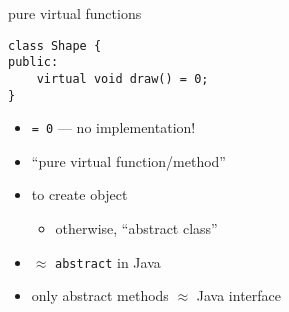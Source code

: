 \begin{frame}{pure virtual functions}
\lstset{language=C++,style=small}
\begin{lstlisting}
class Shape {
public:
    virtual void draw() = 0;
}
\end{lstlisting}
\begin{itemize}
\item \texttt{= 0} --- no implementation!
\item ``pure virtual function/method''
\item {} to create object
    \begin{itemize}
    \item otherwise, ``abstract class''
    \end{itemize}
\item $\approx$ \texttt{abstract} in Java
\item only abstract methods $\approx$ Java interface
\end{itemize}
\end{frame}
